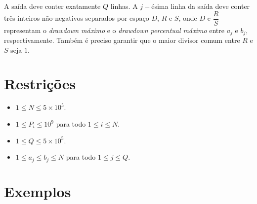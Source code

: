 A saída deve conter exatamente $Q$ linhas. A $j-$ésima linha da saída deve conter três inteiros não-negativos separados por espaço
$D$, $R$ e $S$, onde $D$ e $\dfrac{R}{S}$ representam o \emph{drawdown máximo} e o \emph{drawdown percentual máximo} entre $a_j$ e $b_j$, respectivamente.
Também é preciso garantir que o maior divisor comum entre $R$ e $S$ seja $1$. 

\section*{Restrições}

\begin{itemize}
    \item $1 \leq N \leq 5\times{10}^5$.
    \item $1 \leq P_i \leq {10}^9$ para todo $1 \leq i \leq N$.
    \item $1 \leq Q \leq 5\times{10}^5$.
    \item $1 \leq a_j \leq b_j \leq N$ para todo $1 \leq j \leq Q$.
\end{itemize}


\section*{Exemplos}

\exemplo
